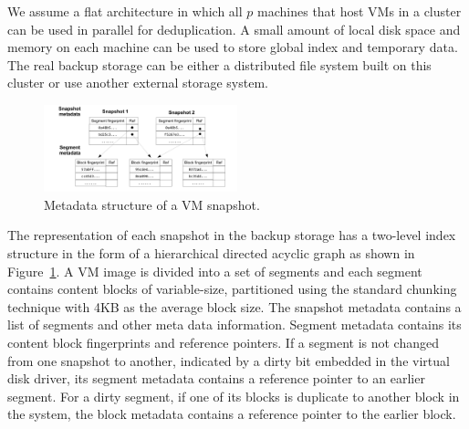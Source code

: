 We assume a flat architecture in which  all $p$ machines that host VMs in a cluster can 
be used in parallel for deduplication. 
A small amount of local disk space and memory on each machine can be used 
to store global index and temporary data. 
The real backup storage can be either a distributed file system built on
this cluster  or use another  external storage system. 



\begin{figure}
\centering
\includegraphics[width=0.5\textwidth]{snapshotdata.pdf}
\caption{ Metadata structure of a VM snapshot.}
\label{fig:snapshot}
\end{figure}

The representation of each snapshot in the backup storage
has a two-level index structure in the form of a hierarchical
directed acyclic graph as shown in Figure~\ref{fig:snapshot}.
A VM image is divided into a set of segments and each  segment contains 
content blocks of variable-size, partitioned using
the standard chunking technique with 4KB as the average block size. 
The snapshot metadata  contains a list of segments and other meta data information.
Segment metadata  contains its  content block fingerprints and reference pointers. 
If a segment is not changed from one snapshot to another, indicated by a dirty bit embedded in the virtual disk driver, 
its segment metadata contains a reference pointer to an earlier segment.
For a dirty segment, if one of its blocks is duplicate to another block in the system,  
the block metadata contains a reference pointer to the earlier block.






